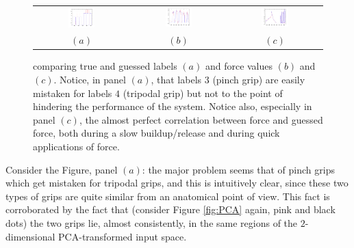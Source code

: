 \begin{figure}[!ht] \centering
  \begin{tabular}{ccc}
    \includegraphics[width=0.3\textwidth]{figs/example1} &
    \includegraphics[width=0.3\textwidth]{figs/example2} &
    \includegraphics[width=0.3\textwidth]{figs/example3} \\
    $(a)$ & $(b)$ & $(c)$ \\
  \end{tabular}
  \caption{comparing true and guessed labels $(a)$ and force values
    $(b)$ and $(c)$. Notice, in panel $(a)$, that labels
    $3$ (pinch grip) are easily mistaken for labels $4$ (tripodal
    grip) but not to the point of hindering the performance of the
    system. Notice also, especially in panel $(c)$, the almost perfect
    correlation between force and guessed force, both during a slow
    buildup/release and during quick applications of force.}
  \label{fig:examples}
\end{figure}

Consider the Figure, panel $(a)$: the major problem seems that of
pinch grips which get mistaken for tripodal grips, and this is
intuitively clear, since these two types of grips are quite similar
from an anatomical point of view. This fact is corroborated by the
fact that (consider Figure \ref{fig:PCA} again, pink and black dots)
the two grips lie, almost consistently, in the same regions of the
$2$-dimensional PCA-transformed input space.

